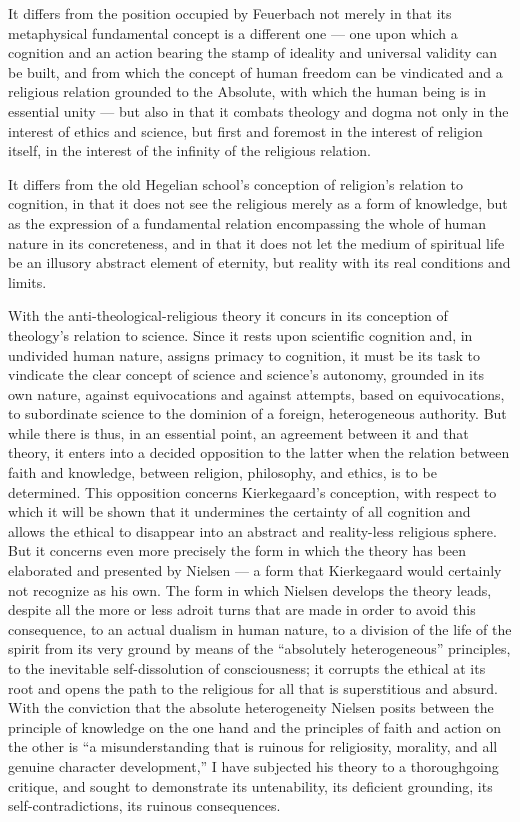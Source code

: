 \documentclass[12pt,a4paper]{article}
\begin{document}
It differs from the position occupied by Feuerbach not merely in that
its metaphysical fundamental concept is a different one --- one upon
which a cognition and an action bearing the stamp of ideality and
universal validity can be built, and from which the concept of human
freedom can be vindicated and a religious relation grounded to the
Absolute, with which the human being is in essential unity --- but
also in that it combats theology and dogma not only in the interest of
ethics and science, but first and foremost in the interest of religion
itself, in the interest of the infinity of the religious relation.

It differs from the old Hegelian school's conception of religion's
relation to cognition, in that it does not see the religious merely as
a form of knowledge, but as the expression of a fundamental relation
encompassing the whole of human nature in its concreteness, and in
that it does not let the medium of spiritual life be an illusory
abstract element of eternity, but reality with its real conditions and
limits.

With the anti-theological-religious theory it concurs in its
conception of theology's relation to science. Since it rests upon
scientific cognition and, in undivided human nature, assigns primacy
to cognition, it must be its task to vindicate the clear concept of
science and science's autonomy, grounded in its own nature, against
equivocations and against attempts, based on equivocations, to
subordinate science to the dominion of a foreign, heterogeneous
authority. But while there is thus, in an essential point, an
agreement between it and that theory, it enters into a decided
opposition to the latter when the relation between faith and
knowledge, between religion, philosophy, and ethics, is to be
determined. This opposition concerns Kierkegaard's conception, with
respect to which it will be shown that it undermines the certainty of
all cognition and allows the ethical to disappear into an abstract and
reality-less religious sphere. But it concerns even more precisely the
form in which the theory has been elaborated and presented by Nielsen
--- a form that Kierkegaard would certainly not recognize as his own.
The form in which Nielsen develops the theory leads, despite all the
more or less adroit turns that are made in order to avoid this
consequence, to an actual dualism in human nature, to a division of
the life of the spirit from its very ground by means of the ``absolutely
heterogeneous'' principles, to the inevitable self-dissolution of
consciousness; it corrupts the ethical at its root and opens the path
to the religious for all that is superstitious and absurd. With the
conviction that the absolute heterogeneity Nielsen posits between the
principle of knowledge on the one hand and the principles of faith and
action on the other is ``a misunderstanding that is ruinous for
religiosity, morality, and all genuine character development,'' I have
subjected his theory to a thoroughgoing critique, and sought to
demonstrate its untenability, its deficient grounding, its
self-contradictions, its ruinous consequences.
\end{document}
